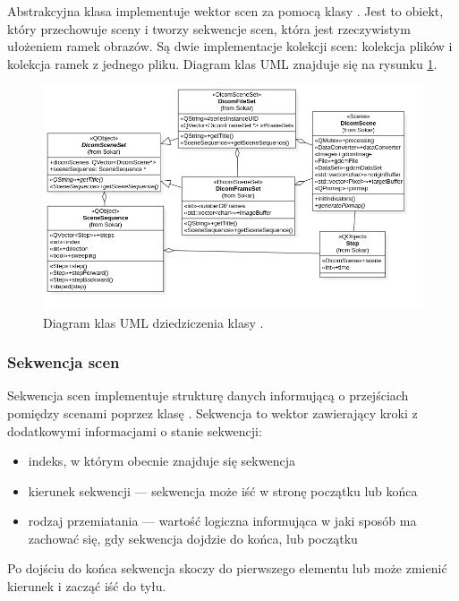 \label{sec:sokar-scenesets}

Abstrakcyjna klasa  implementuje wektor scen za pomocą klasy .
Jest to obiekt, który przechowuje sceny i tworzy sekwencje scen, która jest rzeczywistym ułożeniem ramek obrazów.
Są dwie implementacje kolekcji scen: kolekcja plików i kolekcja ramek z jednego pliku.
Diagram klas UML znajduje się na rysunku \ref{uml:sokar-scene-sets}.

\begin{figure}[!htbp]
    \centering
    \includegraphics[width=\textwidth]{img/uml/sokar-scene-sets.png}
    \caption{Diagram klas UML dziedziczenia klasy .}
    \label{uml:sokar-scene-sets}
\end{figure}

\subsubsection{Sekwencja scen}
\label{sec:sokar-scenesequence}

\par
Sekwencja scen implementuje strukturę danych informującą o przejściach pomiędzy scenami poprzez klasę .
Sekwencja to wektor zawierający kroki z dodatkowymi informacjami o stanie sekwencji:
\begin{itemize}
    \item indeks, w którym obecnie znajduje się sekwencja
    \item kierunek sekwencji --- sekwencja może iść w stronę początku lub końca
    \item rodzaj przemiatania --- wartość logiczna informująca w jaki sposób ma zachować się, gdy sekwencja dojdzie do końca, lub początku
\end{itemize}
Po dojściu do końca sekwencja skoczy do pierwszego elementu lub może zmienić kierunek i zacząć iść do tyłu.

